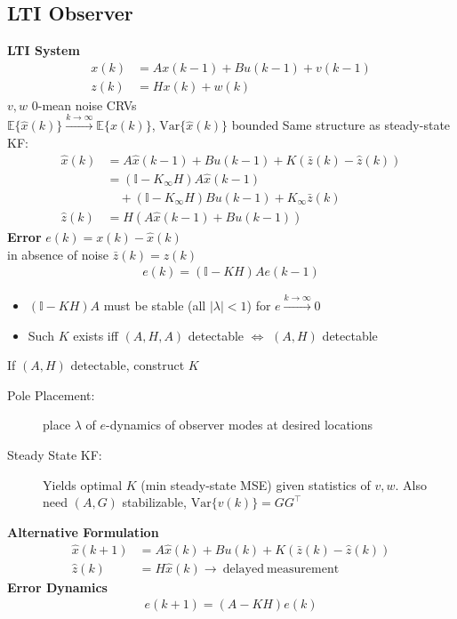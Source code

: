 \subsection{LTI Observer}
\textbf{LTI System}
\begin{align*}
    x(k) &= A x(k-1) + B u(k-1) + v(k-1) \\
    z(k) &= H x(k) + w(k)
\end{align*}
$v, w$ 0-mean noise CRVs\\
$\mathbb{E}\{\widehat{x}(k)\} \xrightarrow{k\to\infty} \mathbb{E}\{x(k)\}$, $\mathrm{Var}\{\widehat{x}(k)\}$ bounded
Same structure as steady-state KF:
\begin{align*}
    \widehat{x}(k) &= A \widehat{x}(k-1) + B u (k-1) + K (\bar{z}(k) - \widehat{z}(k)) \\
    &= ({ \mathbb{I} - K_\infty H}) A \widehat{x}(k-1)\\
    & \quad + ({ \mathbb{I} - K_\infty H})Bu(k-1) + K_\infty \bar{z}(k) \\
    \widehat{z}(k) &= H(A \widehat{x}(k-1) + Bu(k-1))
\end{align*}
\textbf{Error} $e(k) = x(k) - \widehat{x}(k)$ \\
in absence of noise $\bar{z}(k) = z(k)$
\begin{align*}
    e(k) = (\mathbb{I}-KH)A e(k-1)
\end{align*}
\begin{itemize}[leftmargin=1em]
    \item $(\mathbb{I}-KH)A$ must be stable (all $\lvert\lambda\rvert < 1$) for $e\xrightarrow{k\to\infty}0$
    \item Such $K$ exists iff $(A,H,A)$ detectable $\Leftrightarrow$ $(A,H)$ detectable
\end{itemize}

If $(A,H)$ detectable, construct $K$
\begin{description}
    \item[Pole Placement:] place $\lambda$ of $e$-dynamics of observer modes at desired locations 
    \item[Steady State KF:] Yields optimal $K$ (min steady-state MSE) given statistics of $v,w$. 
    Also need $(A,G)$ stabilizable, $\mathrm{Var}\{v(k)\} = GG^\top$
\end{description}
\textbf{Alternative Formulation}
    \begin{align*}
        \widehat{x}(k+1) &= A\widehat{x}(k) + Bu(k) + K(\bar{z}(k) - \widehat{z}(k))\\
        \widehat{z}(k) &= H\widehat{x}(k) \to \mathrm{ \ delayed \ measurement}
    \end{align*}
\textbf{Error Dynamics}
\begin{align*}
    e(k+1) = (A-KH)e(k)
\end{align*}
